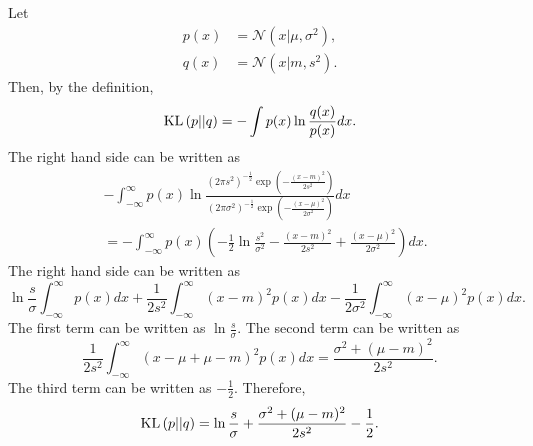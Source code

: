 \subsection{}
Let 
%
\begin{equation}
\begin{aligned}
p(x) &= \mathcal{N} \left( x | \mu, \sigma ^2 \right), \\
q(x) &= \mathcal{N} \left( x | m, s ^2 \right).
\end{aligned}
\end{equation}
%
Then, by the definition,
%
\begin{equation}
{\rm KL} \left( p || q \right) = - \int p(x) \ln \frac{q(x)}{p(x)} dx.
\end{equation}
%
The right hand side can be written as 
%
\begin{equation}
\begin{aligned}
&- \int_{- \infty}^{\infty} p(x) \ln \frac{\left( 2 \pi s ^ 2 \right) ^ {- \frac{1}{2}} \exp \left( - \frac{(x - m) ^ 2}{2 s ^ 2} \right)}{\left( 2 \pi \sigma ^ 2 \right) ^ {- \frac{1}{2}} \exp \left( - \frac{(x - \mu) ^ 2}{2 \sigma ^ 2} \right)} dx \\
& = - \int_{- \infty}^{\infty} p(x) \left( -\frac{1}{2} \ln \frac{s ^ 2}{\sigma ^ 2} - \frac{(x - m) ^ 2}{2 s ^ 2} + \frac{(x - \mu) ^ 2}{2 \sigma ^ 2} \right) dx.
\end{aligned}
\end{equation}
%
The right hand side can be written as
%
\begin{equation}
\ln \frac{s}{\sigma} \int_{- \infty}^{\infty} p(x) dx + \frac{1}{2 s ^2} \int_{- \infty}^{\infty} (x - m) ^ 2 p(x) dx - \frac{1}{2 \sigma ^2} \int_{- \infty}^{\infty} (x - \mu) ^ 2 p(x) dx.
\end{equation}
%
The first term can be written as $\ln \frac{s}{\sigma}$.
The second term can be written as
%
\begin{equation}
\frac{1}{2 s ^2} \int_{- \infty}^{\infty} (x - \mu + \mu - m) ^ 2 p(x) dx = \frac{\sigma ^ 2 + (\mu - m) ^ 2}{2 s ^ 2}.
\end{equation}
%
The third term can be written as $- \frac{1}{2}$.
Therefore,
%
\begin{equation}
{\rm KL} \left( p || q \right) = \ln \frac{s}{\sigma} + \frac{\sigma ^ 2 + (\mu - m) ^ 2}{2 s ^ 2} - \frac{1}{2}. 
\end{equation}
%


